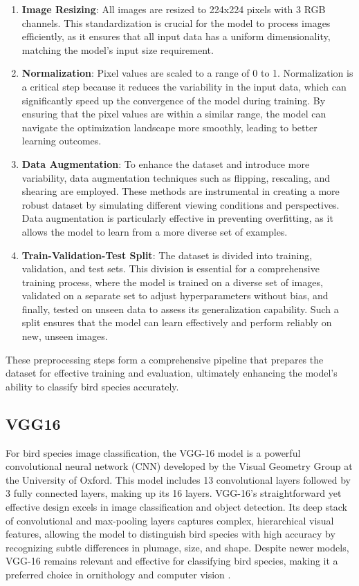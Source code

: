 \begin{enumerate}
    \item \textbf{Image Resizing}: All images are resized to 224x224 pixels with 3 RGB channels. This standardization 
    is crucial for the model to process images efficiently, as it ensures that all input data has a uniform dimensionality, 
    matching the model's input size requirement.

    \item \textbf{Normalization}: Pixel values are scaled to a range of 0 to 1. Normalization is a critical step because 
    it reduces the variability in the input data, which can significantly speed up the convergence of the model during training.
     By ensuring that the pixel values are within a similar range, the model can navigate the optimization landscape more smoothly,
      leading to better learning outcomes.

    \item \textbf{Data Augmentation}: To enhance the dataset and introduce more variability, data augmentation techniques such as flipping, 
    rescaling, and shearing are employed. These methods are instrumental in creating a more robust dataset by simulating different viewing
     conditions and perspectives. Data augmentation is particularly effective in preventing overfitting, as it allows the model to learn 
     from a more diverse set of examples.

    \item \textbf{Train-Validation-Test Split}: The dataset is divided into training, validation, and test sets. This division 
    is essential for a comprehensive training process, where the model is trained on a diverse set of images, validated on a 
    separate set to adjust hyperparameters without bias, and finally, tested on unseen data to assess its generalization capability. 
    Such a split ensures that the model can learn effectively and perform reliably on new, unseen images.
\end{enumerate}

These preprocessing steps form a comprehensive pipeline that prepares the
dataset for effective training and evaluation, ultimately enhancing the model's
ability to classify bird species accurately.

\subsection{VGG16}
For bird species image classification, the VGG-16 model is a powerful
convolutional neural network (CNN) developed by the Visual Geometry Group at
the University of Oxford. This model includes 13 convolutional layers followed
by 3 fully connected layers, making up its 16 layers. VGG-16's straightforward
yet effective design excels in image classification and object detection. Its
deep stack of convolutional and max-pooling layers captures complex,
hierarchical visual features, allowing the model to distinguish bird species
with high accuracy by recognizing subtle differences in plumage, size, and
shape. Despite newer models, VGG-16 remains relevant and effective for
classifying bird species, making it a preferred choice in ornithology and
computer vision \cite{bangar2022vgg}.

